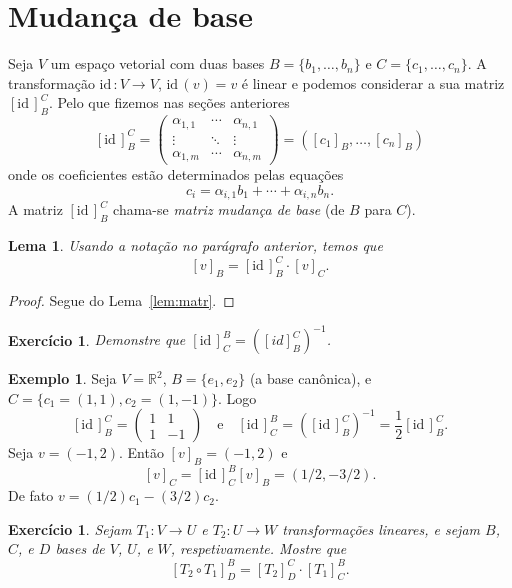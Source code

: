 \documentclass[12pt]{amsart}
\newcommand{\R}{\mathbb R}
\newcommand{\id}{\mbox{id}\,}
\newtheorem{lemma}[theorem]{Lema}
\newtheorem{exercise}[theorem]{Exercício}
\theoremstyle{definition}
\newtheorem{example}[theorem]{Exemplo}
\begin{document}
\section{Mudança de base}
Seja $V$ um espaço vetorial com duas bases $B=\{b_1,\ldots,b_n\}$ e $C=\{c_1,\ldots,c_n\}$. A transformação 
$\id:V\to V$, $\id(v)=v$  é linear e podemos considerar a sua matriz $[\id]_B^C$. Pelo que fizemos 
nas seções anteriores
\[
    [\id]_B^C=\begin{pmatrix} \alpha_{1,1} & \cdots & \alpha_{n,1}\\
        \vdots & \ddots & \vdots \\
        \alpha_{1,m} & \cdots & \alpha_{n,m}
    \end{pmatrix}=\left([c_1]_B,\ldots,[c_n]_B\right)
\]
onde os coeficientes estão determinados pelas equações 
\[
    c_i=\alpha_{i,1}b_1+\cdots+\alpha_{i,n}b_n.
\]
A matriz $[\id]_B^C$ chama-se \emph{matriz mudança de base} (de $B$ para $C$).

\begin{lemma}
    Usando a notação no parágrafo anterior, temos que 
    \[
        [v]_B=[\id]_B^C\cdot [v]_C.
    \]
\end{lemma}
\begin{proof}
    Segue do Lema~\ref{lem:matr}.
\end{proof}

\begin{exercise}
    Demonstre que $[\id]_C^B=([id]_B^C)^{-1}$. 
\end{exercise}

\begin{example}
    Seja $V=\R^2$, $B=\{e_1,e_2\}$ (a base canônica), e $C=\{c_1=(1,1),c_2=(1,-1)\}$. Logo
    \[
        [\id]_B^C=\begin{pmatrix} 1 & 1 \\ 1 & -1\end{pmatrix}\quad \mbox{e}\quad 
        [\id]_C^B=\left([\id]_B^C\right)^{-1}=\frac 12[\id]_B^C.
    \] 
    Seja $v=(-1,2)$. Então $[v]_B=(-1,2)$ e 
    \[
        [v]_C=[\id]^B_C[v]_B=(1/2,-3/2).
    \]
    De fato $v=(1/2)c_1-(3/2)c_2$.
\end{example}

\begin{exercise}\label{ex:comp}
    Sejam $T_1:V\to U$ e $T_2:U\to W$ transformações lineares, e sejam $B$, $C$, e $D$ bases de 
    $V$, $U$, e $W$, respetivamente. Mostre que 
    \[
    [T_2\circ T_1]^B_D=[T_2]^C_D\cdot [T_1]^B_C.
\]
\end{exercise}
\end{document}
